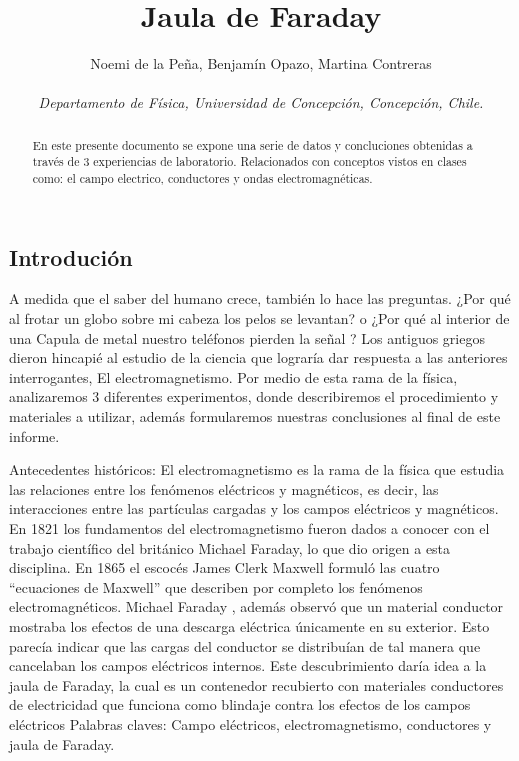 \documentclass[]{article}
\title{Jaula de Faraday}
\author{Noemi de la Peña, Benjamín Opazo, Martina Contreras \\ \\
 \textit{ Departamento de Física, Universidad de Concepción, Concepción, Chile. }}
\date{}
\begin{document}
\maketitle 



    


\begin{abstract}
En este presente documento se expone una serie de datos y concluciones 
obtenidas a través de 3 experiencias de laboratorio. Relacionados con conceptos vistos en clases como: el campo electrico,
conductores y ondas electromagnéticas.
\end{abstract}

\begin{multicols*}{2}

\section*{Introdución}
A medida que el saber del humano crece, también lo hace las preguntas.
    ¿Por qué al frotar un globo sobre mi cabeza los pelos se levantan? o 
    ¿Por qué al interior de una Capula de metal nuestro teléfonos pierden la señal ?
    Los antiguos griegos dieron hincapié al estudio de la ciencia que 
    lograría dar respuesta a las anteriores interrogantes, El electromagnetismo.
Por medio de esta rama de la física, analizaremos 3 diferentes experimentos, donde describiremos el procedimiento y materiales a utilizar, además   formularemos nuestras conclusiones al final de este informe.

%

Antecedentes históricos:
El electromagnetismo es la rama de la física que estudia las relaciones entre los fenómenos eléctricos y magnéticos, es decir, las interacciones entre las partículas cargadas y los campos eléctricos y magnéticos.
En 1821 los fundamentos del electromagnetismo fueron dados a conocer con el trabajo científico del británico Michael Faraday, lo que dio origen a esta disciplina. En 1865 el escocés James Clerk Maxwell formuló las cuatro “ecuaciones de Maxwell” que describen por completo los fenómenos electromagnéticos.
Michael Faraday , además  observó que un material conductor mostraba los efectos de una descarga eléctrica únicamente en su exterior. Esto parecía indicar que las cargas del conductor se distribuían de tal manera que cancelaban los campos eléctricos internos.
Este descubrimiento daría idea a la jaula de Faraday, la cual es un contenedor recubierto con materiales conductores de electricidad que funciona como blindaje contra los efectos de los campos eléctricos
Palabras claves: Campo eléctricos, electromagnetismo, conductores y jaula de Faraday. 



\end{multicols*}
\end{document}
